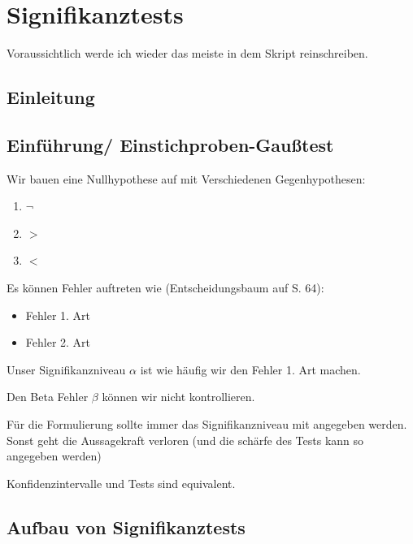 \documentclass[a4paper]{article}
\title{\docTitle}
\author{Moritz}
\date{\today}
\begin{document}
\maketitle
\tableofcontents


\section{Signifikanztests}

Voraussichtlich werde ich wieder das meiste in dem Skript reinschreiben.

\subsection{Einleitung}

\subsection{Einführung/ Einstichproben-Gaußtest}

Wir bauen eine Nullhypothese auf mit Verschiedenen Gegenhypothesen:

\begin{enumerate}
    \item $\neg$
    \item $>$
    \item $<$
\end{enumerate}

Es können Fehler auftreten wie (Entscheidungsbaum auf S. 64):

\begin{itemize}
    \item Fehler 1. Art
    \item Fehler 2. Art
\end{itemize}

Unser Signifikanzniveau $\alpha$ ist wie häufig wir den Fehler 1. Art machen.

Den Beta Fehler $\beta$ können wir nicht kontrollieren.

Für die Formulierung sollte immer das Signifikanzniveau mit angegeben werden. Sonst geht die Aussagekraft verloren (und die schärfe des Tests kann so angegeben werden)

Konfidenzintervalle und Tests sind equivalent.

\subsection{Aufbau von Signifikanztests}
\end{document}
